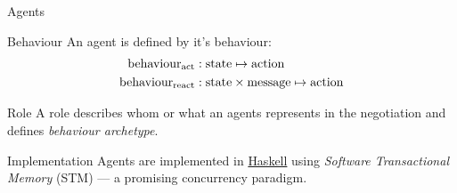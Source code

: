 \begin{frame}{Agents}
  \begin{block}{Behaviour}
    An agent is defined by it's behaviour:
    \begin{align*}
      \mathrm{behaviour}_{\mathrm{act}}   &: \mathrm{state} \mapsto \mathrm{action} \\
      \mathrm{behaviour}_{\mathrm{react}} &: \mathrm{state} \times \mathrm{message} \mapsto \mathrm{action}
    \end{align*}
  \end{block}
  \begin{block}{Role}
    A role describes whom or what an agents represents in the negotiation and
    defines \emph{behaviour archetype}.
  \end{block}
  \begin{block}{Implementation}
    Agents are implemented in \underline{Haskell} using
    \emph{Software Transactional Memory} (STM)
    --- a promising concurrency paradigm.
  \end{block}
\end{frame}
